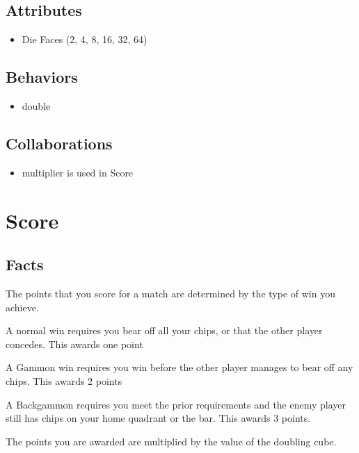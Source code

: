 \documentclass{report}
\begin{document}
\subsection{Attributes}

\begin{itemize}
    \item Die Faces (2, 4, 8, 16, 32, 64)
\end{itemize}

\subsection{Behaviors}

\begin{itemize}
    \item double
\end{itemize}

\subsection{Collaborations}
    \begin{itemize}
    \item multiplier is used in Score
\end{itemize}

\section{Score}

\subsection{Facts}

\begin{dashed}
    \item The points that you score for a match are determined by the type of win you achieve.
    \item A normal win requires you bear off all your chips, or that the other player concedes. This awards one point
    \item A Gammon win requires you win before the other player manages to bear off any chips. This awards 2 points
    \item A Backgammon requires you meet the prior requirements and the enemy player still has chips on your home quadrant or the bar. This awards 3 points.
    \item The points you are awarded are multiplied by the value of the doubling cube.
\end{dashed}
\end{document}
